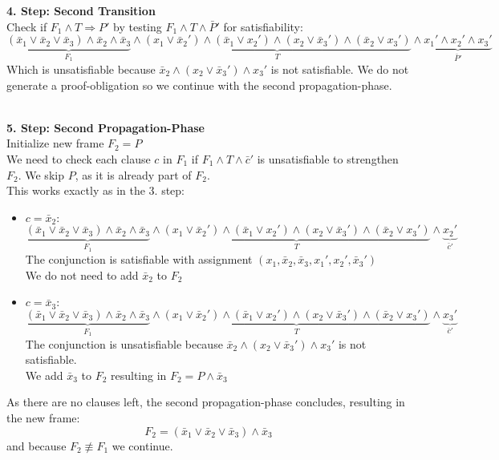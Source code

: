 \documentclass[11pt, a4paper, BCOR=10mm, ngerman, oneside]{scrbook}
\begin{document}
\textbf{4. Step: Second Transition} \\
Check if $F_1 \land T \Rightarrow P'$ by testing $F_1 \land T \land \bar P'$ for satisfiability: 
\begin{equation*}
\underbrace{(\bar x_1 \lor \bar x_2 \lor \bar x_3) \land \bar x_2 \land \bar x_3}_{F_1} \land \underbrace{(x_1 \lor \bar x_2' ) \land ( \bar x_1 \lor x_2') \land (x_2 \lor \bar x_3') \land ( \bar x_2 \lor x_3')}_{T} \land \underbrace{x_1' \land x_2' \land x_3'}_{ \bar P'}
\end{equation*}
Which is unsatisfiable because $\bar x_2 \land (x_2 \lor \bar x_3') \land x_3'$ is not satisfiable. We do not generate a proof-obligation so we continue with the second propagation-phase. \\ \\ \par

\textbf{5. Step: Second Propagation-Phase} \\
Initialize new frame $F_2 = P$ \\
We need to check each clause $c$ in $F_1$ if $F_1 \land T \land \bar c'$ is unsatisfiable to strengthen $F_2$. We skip $P$, as it is already part of $F_2$. \\ 
This works exactly as in the 3. step: \par
\begin{itemize}
\item $c = \bar x_2:$ 
\begin{equation*}
\underbrace{(\bar x_1 \lor \bar x_2 \lor \bar x_3) \land \bar x_2 \land \bar x_3}_{F_1} \land \underbrace{(x_1 \lor \bar x_2' ) \land ( \bar x_1 \lor x_2') \land (x_2 \lor \bar x_3') \land ( \bar x_2 \lor x_3')}_{T} \land \underbrace{x_2'}_{\bar c'}
\end{equation*}
The conjunction is satisfiable with assignment $(x_1, \bar x_2, \bar x_3, x_1', x_2', \bar x_3')$ \\
We do not need to add $\bar x_2$ to $F_2$ \\

\item $c = \bar x_3:$ 
\begin{equation*} 
\underbrace{(\bar x_1 \lor \bar x_2 \lor \bar x_3) \land \bar x_2 \land \bar x_3}_{F_1} \land \underbrace{(x_1 \lor \bar x_2' ) \land ( \bar x_1 \lor x_2') \land (x_2 \lor \bar x_3') \land ( \bar x_2 \lor x_3')}_{T} \land \underbrace{x_3'}_{\bar c'}
\end{equation*}
The conjunction is unsatisfiable because $\bar x_2 \land (x_2 \lor \bar x_3') \land x_3'$ is not satisfiable. \\ We add $\bar x_3$ to $F_2$ resulting in $F_2 = P \land \bar x_3$
\end{itemize}
As there are no clauses left, the second propagation-phase concludes, resulting in the new frame:
\begin{equation*}
F_2 = (\bar x_1 \lor \bar x_2 \lor \bar x_3) \land \bar x_3
\end{equation*}
and because $F_2 \not\equiv F_1$ we continue. \\ \\
\end{document}
